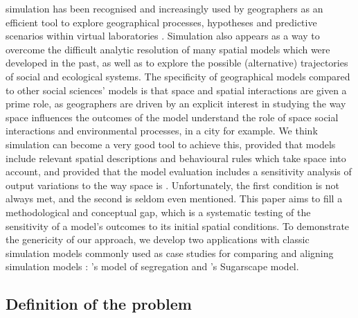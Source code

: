 \documentclass[3p,times,procedia]{elsarticle}
\begin{document}
 simulation  has been recognised and increasingly used by geographers as an efficient tool to explore geographical processes, hypotheses and predictive scenarios within virtual laboratories \citep{batty1971modelling, batty2007model, carley1999generating, Quesneletal2009}. %
 Simulation also appears as a way to overcome the difficult analytic resolution of many spatial models which were developed in the past, as well as to explore the possible (alternative) trajectories of  social and ecological systems. The specificity of geographical models compared to other social sciences' models is that space and spatial interactions are given a prime role, as geographers are driven by an explicit interest in studying the way space influences the outcomes of the model  understand the role of space  social interactions and environmental processes, in a city for example. We think simulation can become a very good tool to achieve this, provided that models  include relevant spatial descriptions and behavioural rules which take space into account, and provided that the model evaluation includes a sensitivity analysis of output variations to the way space is . Unfortunately, the first condition is not always met, and the second is seldom even mentioned. This paper aims to fill a methodological and conceptual gap, which is a systematic testing of the sensitivity of a model's outcomes to its initial spatial conditions. To demonstrate the genericity of our approach, we develop two applications with classic simulation models commonly used as case studies for comparing and aligning simulation models \citep{Axtelletal1996, wilensky2007making}: \citet{schelling1971dynamic}'s model of segregation and \citet{EpsteinAxtell1996}'s Sugarscape model.\\

\subsection{Definition of the problem}
\end{document}
